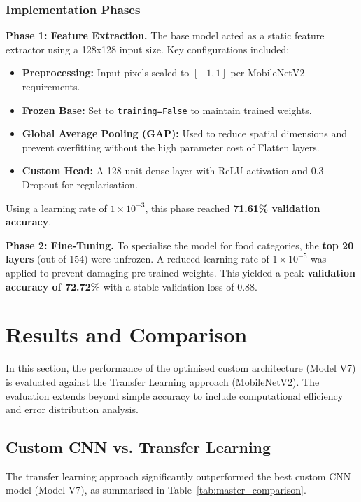 \documentclass[a4paper,11pt]{article}
\begin{document}
\subsubsection{Implementation Phases}
\textbf{Phase 1: Feature Extraction.} The base model acted as a static feature extractor using a 128x128 input size. Key configurations included:
\begin{itemize}
    \item \textbf{Preprocessing:} Input pixels scaled to $[-1, 1]$ per MobileNetV2 requirements.
    \item \textbf{Frozen Base:} Set to \texttt{training=False} to maintain trained weights.
    \item \textbf{Global Average Pooling (GAP):} Used to reduce spatial dimensions and prevent overfitting without the high parameter cost of Flatten layers.
    \item \textbf{Custom Head:} A 128-unit dense layer with ReLU activation and 0.3 Dropout for regularisation.
\end{itemize}
Using a learning rate of $1 \times 10^{-3}$, this phase reached \textbf{71.61\% validation accuracy}.

\noindent \textbf{Phase 2: Fine-Tuning.} To specialise the model for food categories, the \textbf{top 20 layers} (out of 154) were unfrozen. A reduced learning rate of \textbf{$1 \times 10^{-5}$} was applied to prevent damaging pre-trained weights. This yielded a peak \textbf{validation accuracy of 72.72\%} with a stable validation loss of 0.88.

\section{Results and Comparison}

In this section, the performance of the optimised custom architecture (Model V7) is evaluated against the Transfer Learning approach (MobileNetV2). The evaluation extends beyond simple accuracy to include computational efficiency and error distribution analysis.

\subsection{Custom CNN vs. Transfer Learning}
The transfer learning approach significantly outperformed the best custom CNN model (Model V7), as summarised in Table~\ref{tab:master_comparison}.
\end{document}
